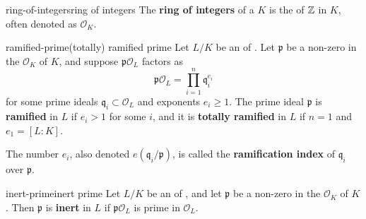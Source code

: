 \begin{topic}{ring-of-integers}{ring of integers}
    The \textbf{ring of integers} of a  $K$ is the  of $\mathbb{Z}$ in $K$, often denoted as $\mathcal{O}_K$. %
\end{topic}

\begin{topic}{ramified-prime}{(totally) ramified prime}
    Let $L/K$ be an  of . Let $\mathfrak{p}$ be a non-zero  in the  $\mathcal{O}_K$ of $K$, and suppose $\mathfrak{p} \mathcal{O}_L$ factors as
    \[ \mathfrak{p} \mathcal{O}_L = \prod_{i = 1}^{n} \mathfrak{q}_i^{e_i} \]
    for some prime ideals $\mathfrak{q}_i \subset \mathcal{O}_L$ and exponents $e_i \ge 1$.
    The prime ideal $\mathfrak{p}$ is \textbf{ramified} in $L$ if $e_i > 1$ for some $i$, and it is \textbf{totally ramified} in $L$ if $n = 1$ and $e_1 = [L : K]$.
    
    The number $e_i$, also denoted $e(\mathfrak{q}_i / \mathfrak{p})$, is called the \textbf{ramification index} of $\mathfrak{q}_i$ over $\mathfrak{p}$.
\end{topic}

\begin{topic}{inert-prime}{inert prime}
    Let $L/K$ be an  of , and let $\mathfrak{p}$ be a non-zero  in the  $\mathcal{O}_K$ of $K$. Then $\mathfrak{p}$ is \textbf{inert} in $L$ if $\mathfrak{p} \mathcal{O}_L$ is prime in $\mathcal{O}_L$.
\end{topic}

    

